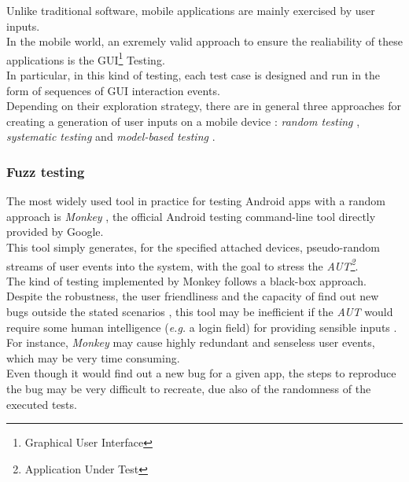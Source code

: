 Unlike traditional software, mobile applications are mainly exercised by user inputs. \\ 
In the mobile world, an exremely valid approach to ensure the realiability of these applications is the GUI\footnote{Graphical User Interface} Testing. \\ 
In particular, in this kind of testing, each test case is designed and run in the form of sequences of GUI interaction events.  \\
Depending on their exploration strategy, there are in general three approaches for creating a generation of user inputs on a mobile device \cite{dynodroid, areWeThereYet}: \textit{random testing} \cite{dynodroid, monkey}, \textit{systematic testing} \cite{evodroid} and \textit{model-based testing} \cite{mobiguitar, guidedgui, mining}. 
\subsubsection{Fuzz testing}
The most widely used tool in practice for testing Android apps with a random approach is \textit{Monkey} \cite{monkey}, the official Android testing command-line tool directly provided by Google. \\
This tool simply generates, for the specified attached devices, pseudo-random streams of user events into the system, with the goal to stress the \textit{AUT\footnote{Application Under Test}}\cite{monkey}. \\ 
The kind of testing implemented by Monkey follows a black-box approach. 
Despite the robustness, the user friendliness \cite{dynodroid} and the capacity of find out new bugs outside the stated scenarios  \cite{monkey_2}, this tool may be inefficient if the \textit{AUT} would require some human intelligence (\textit{e.g.} a login field) for providing sensible inputs \cite{dynodroid}. \\
For instance, \textit{Monkey} may cause highly redundant and senseless user events, which may be very  time consuming. \\
Even though it would find out a new bug for a given app, the steps to reproduce the bug may be very difficult to recreate, due also of the randomness of the executed tests. 






